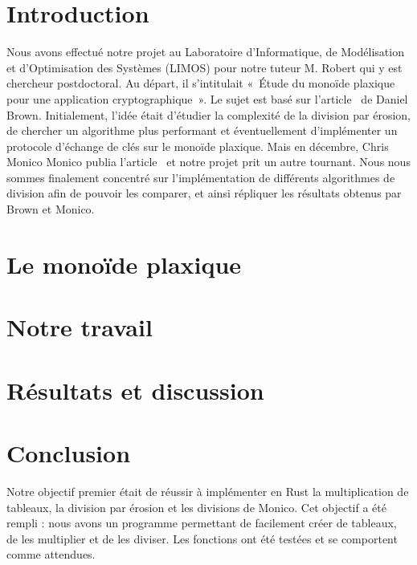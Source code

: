 \documentclass[12pt, a4paper, oneside]{memoir}
\begin{document}
\chapter{Introduction}
Nous avons effectué notre projet au Laboratoire d'Informatique, de Modélisation et d'Optimisation des Systèmes (LIMOS) pour notre tuteur M. Robert qui y est chercheur postdoctoral. Au départ, il s'intitulait «~Étude du monoïde plaxique pour une application cryptographique~». Le sujet est basé sur l'article~\cite{brown2021plactic} de Daniel Brown. Initialement, l'idée était d'étudier la complexité de la division par érosion, de chercher un algorithme plus performant et éventuellement d'implémenter un protocole d'échange de clés sur le monoïde plaxique. Mais en décembre, Chris Monico Monico publia l'article~\cite{monico2022division} et notre projet prit un autre tournant. Nous nous sommes finalement concentré sur l'implémentation de différents algorithmes de division afin de pouvoir les comparer, et ainsi répliquer les résultats obtenus par Brown et Monico.

\mainmatter


\chapter{Le monoïde plaxique} \label{ch1}


\chapter{Notre travail} \label{ch2}


\chapter{Résultats et discussion} \label{ch3}


\backmatter

\chapter{Conclusion}
Notre objectif premier était de réussir à implémenter en Rust la multiplication de tableaux, la division par érosion et les divisions de Monico. Cet objectif a été rempli : nous avons un programme permettant de facilement créer de tableaux, de les multiplier et de les diviser. Les fonctions ont été testées et se comportent comme attendues. 
\end{document}
